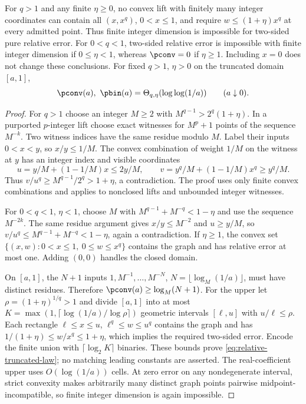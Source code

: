 \begin{proposition}\label{prop:relative-power}
For $q>1$ and any finite $\eta\ge0$, no convex lift with finitely
many integer coordinates can contain all $(x,x^q)$, $0<x\le1$,
and require $w\le(1+\eta)x^q$ at every admitted point. Thus finite
integer dimension is impossible for two-sided pure relative error.
For $0<q<1$, two-sided relative error is impossible with finite integer
dimension if $0\le\eta<1$, whereas $\pconv=0$ if $\eta\ge1$.
Including $x=0$ does not change these conclusions.
For fixed $q>1$, $\eta>0$ on the truncated domain $[a,1]$,
\begin{equation}\label{eq:relative-truncated-law}
 \pconv(a),\ \pbin(a)=\Theta_{q,\eta}(\log\log(1/a))
 \qquad(a\downarrow0).
\end{equation}
\end{proposition}
\begin{proof}
For $q>1$ choose an integer $M\ge2$ with
$M^{q-1}>2^q(1+\eta)$. In a purported $p$-integer lift choose
exact witnesses for $M^p+1$ points of the sequence $M^{-k}$.
Two witness indices have the same residue modulo $M$. Label their
inputs $0<x<y$, so $x/y\le1/M$. The convex combination of weight
$1/M$ on the witness at $y$ has an integer index and visible coordinates
\[
 u=y/M+(1-1/M)x\le2y/M,\qquad
 v=y^q/M+(1-1/M)x^q\ge y^q/M.
\]
Thus $v/u^q\ge M^{q-1}/2^q>1+\eta$, a contradiction. The proof
uses only finite convex combinations and applies to nonclosed lifts
and unbounded integer witnesses.

For $0<q<1$, $\eta<1$, choose $M$ with
$M^{q-1}+M^{-q}<1-\eta$ and use the sequence $M^{-2k}$.
The same residue argument gives $x/y\le M^{-2}$ and $u\ge y/M$,
so $v/u^q\le M^{q-1}+M^{-q}<1-\eta$, again a contradiction.
If $\eta\ge1$, the convex set
$\{(x,w):0<x\le1,\ 0\le w\le x^q\}$ contains the graph and
has relative error at most one. Adding $(0,0)$ handles the closed domain.

On $[a,1]$, the $N+1$ inputs $1,M^{-1},\ldots,M^{-N}$,
$N=\lfloor\log_M(1/a)\rfloor$, must have distinct residues.
Therefore $\pconv(a)\ge\log_M(N+1)$. For the upper let
$\rho=(1+\eta)^{1/q}>1$ and divide $[a,1]$ into at most
$K=\max(1,\lceil\log(1/a)/\log\rho\rceil)$ geometric intervals
$[\ell,u]$ with $u/\ell\le\rho$. Each rectangle
$\ell\le x\le u$, $\ell^q\le w\le u^q$ contains the graph
and has $1/(1+\eta)\le w/x^q\le1+\eta$, which implies the
required two-sided error. Encode the finite union with
$\lceil\log_2K\rceil$ binaries. These bounds prove
\eqref{eq:relative-truncated-law}; no matching leading constants
are asserted. The real-coefficient upper uses $O(\log(1/a))$ cells.
At zero error on any nondegenerate interval, strict convexity makes
arbitrarily many distinct graph points pairwise midpoint-incompatible,
so finite integer dimension is again impossible.
\end{proof}

